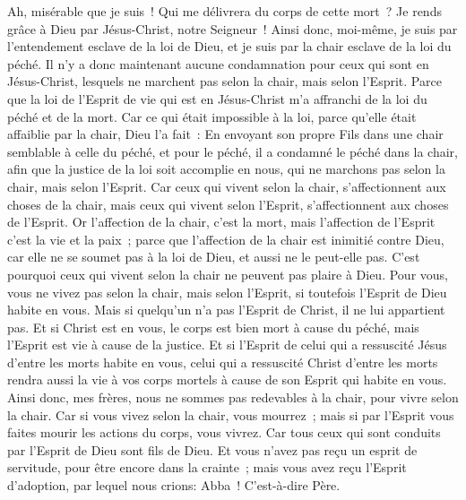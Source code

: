 \begin{multicols}{2}
Ah, misérable que je suis~! Qui me délivrera du corps de cette mort~?
Je rends grâce à Dieu par Jésus-Christ, notre Seigneur~! Ainsi donc, moi-même, je suis par l'entendement esclave de la loi de Dieu, et je suis par la chair esclave de la loi du péché.
\VerseOne{}Il n'y a donc maintenant aucune condamnation pour ceux qui sont en Jésus-Christ, lesquels ne marchent pas selon la chair, mais selon l'Esprit.
Parce que la loi de l'Esprit de vie qui est en Jésus-Christ m'a affranchi de la loi du péché et de la mort.
Car ce qui était impossible à la loi, parce qu'elle était affaiblie par la chair, Dieu l'a fait~: En envoyant son propre Fils dans une chair semblable à celle du péché, et pour le péché, il a condamné le péché dans la chair,
afin que la justice de la loi soit accomplie en nous, qui ne marchons pas selon la chair, mais selon l'Esprit.
Car ceux qui vivent selon la chair, s'affectionnent aux choses de la chair, mais ceux qui vivent selon l'Esprit, s'affectionnent aux choses de l'Esprit.
Or l'affection de la chair, c'est la mort, mais l'affection de l'Esprit c'est la vie et la paix~;
parce que l'affection de la chair est inimitié contre Dieu, car elle ne se soumet pas à la loi de Dieu, et aussi ne le peut-elle pas.
C'est pourquoi ceux qui vivent selon la chair ne peuvent pas plaire à Dieu.
Pour vous, vous ne vivez pas selon la chair, mais selon l'Esprit, si toutefois l'Esprit de Dieu habite en vous. Mais si quelqu'un n'a pas l'Esprit de Christ, il ne lui appartient pas.
Et si Christ est en vous, le corps est bien mort à cause du péché, mais l'Esprit est vie à cause de la justice.
Et si l'Esprit de celui qui a ressuscité Jésus d'entre les morts habite en vous, celui qui a ressuscité Christ d'entre les morts rendra aussi la vie à vos corps mortels à cause de son Esprit qui habite en vous.
Ainsi donc, mes frères, nous ne sommes pas redevables à la chair, pour vivre selon la chair.
Car si vous vivez selon la chair, vous mourrez~; mais si par l'Esprit vous faites mourir les actions du corps, vous vivrez.
Car tous ceux qui sont conduits par l'Esprit de Dieu sont fils de Dieu.
Et vous n'avez pas reçu un esprit de servitude, pour être encore dans la crainte~; mais vous avez reçu l'Esprit d'adoption, par lequel nous crions: Abba~! C'est-à-dire Père.

\end{multicols}
